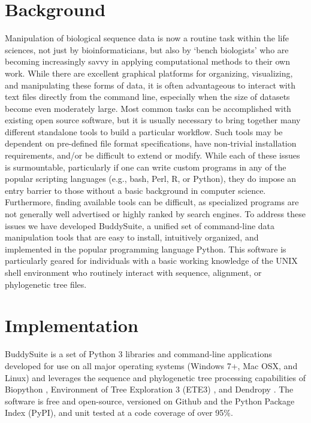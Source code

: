 \documentclass[twocolumn]{bmcart}%
\begin{document}
\section*{Background}
Manipulation of biological sequence data is now a routine task within the life sciences, not just by bioinformaticians, but also by `bench biologists' who are becoming increasingly savvy in applying computational methods to their own work. While there are excellent graphical platforms for organizing, visualizing, and manipulating these forms of data, it is often advantageous to interact with text files directly from the command line, especially when the size of datasets become even moderately large. Most common tasks can be accomplished with existing open source software, but it is usually necessary to bring together many different standalone tools to build a particular workflow. Such tools may be dependent on pre-defined file format specifications, have non-trivial installation requirements, and/or be difficult to extend or modify. While each of these issues is surmountable, particularly if one can write custom programs in any of the popular scripting languages (e.g., bash, Perl, R, or Python), they do impose an entry barrier to those without a basic background in computer science. Furthermore, finding available tools can be difficult, as specialized programs are not generally well advertised or highly ranked by search engines. To address these issues we have developed BuddySuite, a unified set of command-line data manipulation tools that are easy to install, intuitively organized, and implemented in the popular programming language Python. This software is particularly geared for individuals with a basic working knowledge of the UNIX shell environment who routinely interact with sequence, alignment, or phylogenetic tree files.


\section*{Implementation}
BuddySuite is a set of Python 3 libraries and command-line applications developed for use on all major operating systems (Windows 7+, Mac OSX, and Linux) and leverages the sequence and phylogenetic tree processing capabilities of Biopython \cite{Cock:2009hj}, Environment of Tree Exploration 3 (ETE3) \cite{HuertaCepas:2016hw}, and Dendropy \cite{Sukumaran:2010id}. The software is free and open-source, versioned on Github \cite{github} and the Python Package Index \cite{pypi} (PyPI), and unit tested at a code coverage of over 95\%. 
\end{document}

